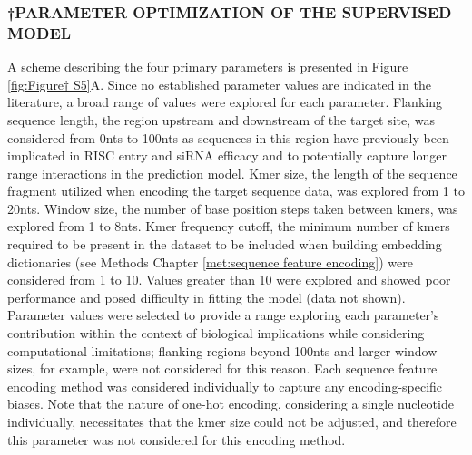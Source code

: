 \documentclass{report}
\begin{document}
\subsubsection{†PARAMETER OPTIMIZATION OF THE SUPERVISED MODEL}
 A scheme describing the four primary parameters is presented in Figure \ref{fig:Figure† S5}A. Since no established parameter values are indicated in the literature, a broad range of values were explored for each parameter. Flanking sequence length, the region upstream and downstream of the target site, was considered from 0nts to 100nts as sequences in this region have previously been implicated in RISC entry and siRNA efficacy \cite{schubert_local_2005,shmushkovich_functional_2018,sun_sequence_2010} and to potentially capture longer range interactions in the prediction model. Kmer size, the length of the sequence fragment utilized when encoding the target sequence data, was explored from 1 to 20nts. Window size, the number of base position steps taken between kmers, was explored from 1 to 8nts. Kmer frequency cutoff, the minimum number of kmers required to be present in the dataset to be included when building embedding dictionaries (see Methods Chapter \ref{met:sequence feature encoding}) were considered from 1 to 10. Values greater than 10 were explored and showed poor performance and posed difficulty in fitting the model (data not shown). Parameter values were selected to provide a range exploring each parameter’s contribution within the context of biological implications while considering computational limitations; flanking regions beyond 100nts and larger window sizes, for example, were not considered for this reason. Each sequence feature encoding method was considered individually to capture any encoding-specific biases. Note that the nature of one-hot encoding, considering a single nucleotide individually, necessitates that the kmer size could not be adjusted, and therefore this parameter was not considered for this encoding method. 
 
\end{document}
